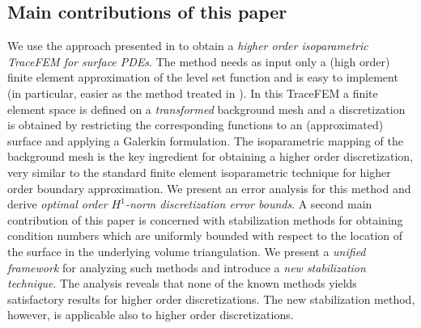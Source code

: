 \documentclass[final]{siamltex}
\begin{document}
\subsection*{Main contributions of this paper}
We use the approach presented in \cite{lehrenfeld2015cmame} to obtain a \emph{higher order isoparametric TraceFEM for surface PDEs}. The method needs as input only a (high order) finite element approximation of the level set function and is easy to implement (in particular, easier as the method treated in \cite{grande2014highordersjna}). In this TraceFEM a finite element space is defined 
on a \emph{transformed} background mesh and a discretization is obtained by restricting the corresponding functions to an (approximated) surface and applying a Galerkin formulation. The isoparametric mapping of the background mesh is the key ingredient for obtaining a higher order discretization, very similar to the standard finite element isoparametric technique for higher order boundary approximation. We present an error analysis for this method and derive \emph{optimal order $H^1$-norm discretization error bounds}. A second main contribution of this paper is concerned with stabilization methods for obtaining condition numbers which are uniformly bounded with respect to the location of the surface in the underlying volume triangulation. We present a \emph{unified framework} for analyzing such methods and introduce a \emph{new stabilization technique}. The analysis reveals that none of the known methods yields satisfactory results for higher order discretizations. The new stabilization method, however, is applicable also to higher order discretizations. 
\end{document}
